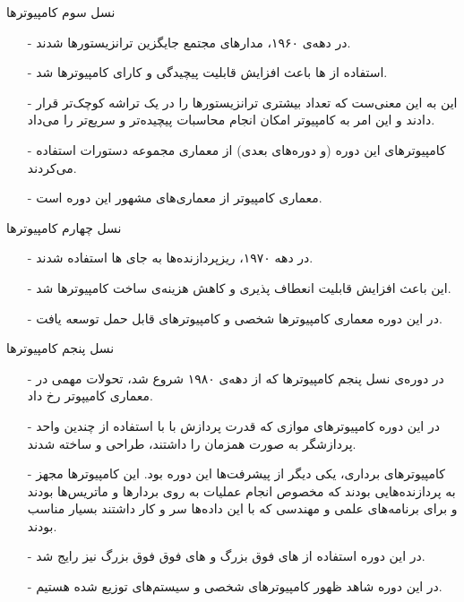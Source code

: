 \begin{frame}{نسل سوم کامپیوتر‌ها}
\begin{itemize}\itemr
\item[-]
در دهه‌ی ۱۹۶۰، مدار‌های مجتمع 
جایگزین ترانزیستور‌ها شدند.
\item[-]
استفاده از ها باعث افزایش قابلیت پیچیدگی و کارای کامپیوتر‌ها شد.
\item[-]
این به این معنی‌ست که تعداد بیشتری ترانزیستور‌ها را در یک تراشه کوچک‌تر قرار دادند و این امر به کامپیوتر امکان انجام محاسبات پیچیده‌تر و سریع‌تر را می‌داد.
\item[-]
کامپیوتر‌های این دوره (و دوره‌‌های بعدی) از معماری مجموعه دستورات 
استفاده می‌کردند.
\item[-]
معماری کامپیوتر 
از معماری‌های مشهور این دوره است.
\end{itemize}
\end{frame}

\begin{frame}{نسل چهارم کامپیوتر‌‌ها}
\begin{itemize}\itemr
\item[-]
در دهه‌ ۱۹۷۰، ریزپردازنده‌‌ها به جای 
ها
استفاده شدند. 
\item[-]
این باعث افزایش قابلیت انعطاف پذیری و کاهش هزینه‌ی ساخت کامپیوتر‌ها شد.
\item[-]
در این دوره معماری کامپیوتر‌ها شخصی و کامپیوتر‌های قابل حمل توسعه یافت.
\end{itemize}
\end{frame}

\begin{frame}{نسل پنجم کامپیوتر‌ها}
\begin{itemize}\itemr
\item[-]
در دوره‌ی نسل پنجم کامپیوتر‌‌ها که از دهه‌ی ۱۹۸۰ شروع شد، تحولات مهمی در معماری کامیپوتر رخ داد.
\item[-]
در این دوره کامپیوتر‌های موازی که قدرت پردازش با با استفاده از چندین واحد پردازشگر به صورت همزمان را داشتند، طراحی و ساخته شدند.
\item[-]
کامپیوتر‌‌های برداری، یکی دیگر از پیشرفت‌ها این دوره بود. این کامپیوتر‌‌ها مجهز به پردازنده‌‌هایی بودند که مخصوص انجام عملیات به روی بردارها و ماتریس‌ها بودند و برای برنامه‌های علمی و مهندسی که با این داده‌‌ها سر و کار داشتند بسیار مناسب بودند.
\item[-]
در این دوره استفاده از 
های 
فوق بزرگ
و 
های
فوق فوق بزرگ
نیز رایج شد.
\item[-]
در این دوره شاهد ظهور کامپیوتر‌های شخصی
و سیستم‌های توزیع شده
هستیم.
\end{itemize}
\end{frame}